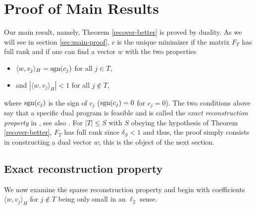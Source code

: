 \documentclass[11pt]{article}
\def\sgn{{\hbox{sgn}}}
\newcommand{\<}{\langle}
\renewcommand{\>}{\rangle}
\numberwithin{equation}{section}
\begin{document}
\section{Proof of Main Results}
\label{sec:main}

Our main result, namely, Theorem \ref{recover-better} is proved by
duality. As we will see in section \ref{sec:main-proof}, $c$ is the
unique minimizer if the matrix $F_T$ has full rank and if one can find
a vector $w$ with the two properties
\begin{itemize}
\item[(i)] $\langle w, v_j \rangle_H = \sgn(c_j)$ for all $j \in T$, 
\item[(ii)] and $|\langle w, v_j \rangle_H| < 1$ for all $j
  \notin T$,
\end{itemize}
where $\sgn(c_j)$ is the sign of $c_j$ ($\sgn(c_j) = 0$ for $c_j =
0$). The two conditions above say that a specific dual program is
feasible and is called the {\em exact reconstruction property} in
\cite{OptimalRecovery}, see also \cite{CRT}.  For $|T| \le S$ with $S$
obeying the hypothesis of Theorem \ref{recover-better}, $F_T$ has full
rank since $\delta_S < 1$ and thus, the proof simply consists in
constructing a dual vector $w$; this is the object of the next
section.

\subsection{Exact reconstruction property}

We now examine the sparse reconstruction property and begin with
coefficients $\langle w, v_j \rangle_H$ for $j \not \in T$ being only
small in an $\ell_2$ sense.
\end{document}
